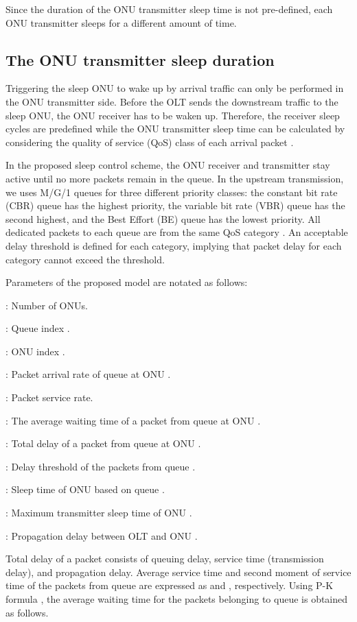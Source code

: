 \documentclass[11pt,english,12pt,onecolumn, draftcls]{IEEEtran}
\theoremstyle{plain}
\theoremstyle{definition}
\begin{document}
Since the duration of the ONU transmitter sleep time is not pre-defined, each ONU transmitter sleeps for a different amount of time.

\subsection{The ONU transmitter sleep duration}
\label{tx}
Triggering the sleep ONU to wake up by arrival traffic can only be performed in the ONU transmitter side. Before the OLT sends the downstream traffic to the sleep ONU, the ONU receiver has to be waken up. Therefore, the receiver sleep cycles are predefined while the ONU transmitter sleep time can be calculated by considering the quality of service (QoS) class of each arrival packet \cite{Dhaini11}.

In the proposed sleep control scheme, the ONU receiver and transmitter stay active until no more packets remain in the queue. In the upstream transmission, we uses M/G/1 queues for three different priority classes: the constant bit rate (CBR) queue has the highest priority, the variable bit rate (VBR) queue has the second highest, and the Best Effort (BE) queue has the lowest priority. All dedicated packets to each queue are from the same QoS category \cite{union2001itu}. An acceptable delay threshold is defined for each category, implying that packet delay for each category cannot exceed the threshold.


Parameters of the proposed model are notated as follows:

: Number of ONUs.

 : Queue index .

 : ONU index .

: Packet arrival rate of queue  at ONU .

: Packet service rate.

: The average waiting time of a packet from queue  at ONU .

: Total delay of a packet from queue  at ONU .

: Delay threshold of the packets from queue .

: Sleep time of ONU  based on queue .

: Maximum transmitter sleep time of ONU .

: Propagation delay between OLT and ONU .




Total delay of a packet consists of queuing delay, service time (transmission delay), and propagation delay. Average service time and second moment of service time of the packets from queue  are expressed as  and , respectively. Using P-K formula \cite{bertsekas1992data}, the average waiting time for the packets belonging to queue  is obtained as follows.
\end{document}
